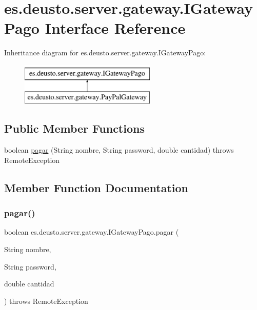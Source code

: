 \hypertarget{interfacees_1_1deusto_1_1server_1_1gateway_1_1_i_gateway_pago}{}\section{es.\+deusto.\+server.\+gateway.\+I\+Gateway\+Pago Interface Reference}
\label{interfacees_1_1deusto_1_1server_1_1gateway_1_1_i_gateway_pago}
Inheritance diagram for es.\+deusto.\+server.\+gateway.\+I\+Gateway\+Pago\+:\begin{figure}[H]
\begin{center}
\leavevmode
\includegraphics[height=2.000000cm]{interfacees_1_1deusto_1_1server_1_1gateway_1_1_i_gateway_pago}
\end{center}
\end{figure}
\subsection*{Public Member Functions}
\begin{DoxyCompactItemize}
\item 
boolean \mbox{\hyperlink{interfacees_1_1deusto_1_1server_1_1gateway_1_1_i_gateway_pago_ade79cd2d58d4005a6e3e71e9b81c3996}{pagar}} (String nombre, String password, double cantidad)  throws Remote\+Exception
\end{DoxyCompactItemize}


\subsection{Member Function Documentation}
\mbox{\label{interfacees_1_1deusto_1_1server_1_1gateway_1_1_i_gateway_pago_ade79cd2d58d4005a6e3e71e9b81c3996}} 
\subsubsection{\texorpdfstring{pagar()}{pagar()}}
{\footnotesize\ttfamily boolean es.\+deusto.\+server.\+gateway.\+I\+Gateway\+Pago.\+pagar (\begin{DoxyParamCaption}\item[{String}]{nombre,  }\item[{String}]{password,  }\item[{double}]{cantidad }\end{DoxyParamCaption}) throws Remote\+Exception}




